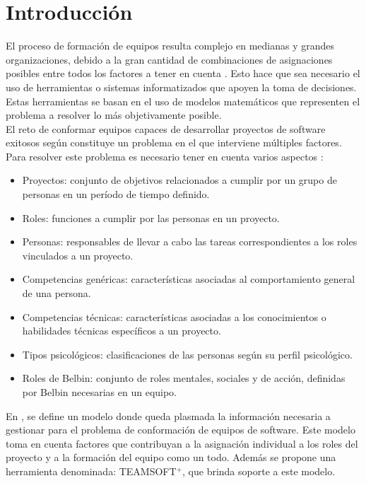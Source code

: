 \chapter*{Introducción}

El proceso de formación de equipos resulta complejo en medianas y grandes organizaciones, debido a la gran cantidad de combinaciones de asignaciones posibles entre todos los factores a tener en cuenta \cite{Mayi09}. Esto hace que sea necesario el uso de herramientas o sistemas informatizados que apoyen la toma de decisiones. Estas herramientas se basan en el uso de modelos matemáticos que representen el problema a resolver lo más objetivamente posible.\\ 

El reto de conformar equipos capaces de desarrollar proyectos de software exitosos según \cite{ana14} constituye un problema en el que interviene múltiples factores. Para resolver este problema es necesario tener en cuenta varios aspectos \cite{ana15}:
\begin{itemize}
	
\item Proyectos: conjunto de objetivos relacionados a cumplir por un grupo de personas en un período de tiempo definido.

\item Roles: funciones a cumplir por las personas en un proyecto.

\item Personas: responsables de llevar a cabo las tareas correspondientes a los roles vinculados a un proyecto.

\item Competencias genéricas: características asociadas al comportamiento general de una persona.

\item Competencias técnicas: características asociadas a los conocimientos o habilidades técnicas específicos a un proyecto. 

\item Tipos psicológicos: clasificaciones de las personas según su perfil psicológico.

\item Roles de Belbin: conjunto de roles mentales, sociales y de acción, definidas por Belbin necesarias en un equipo.

\end{itemize}	

En \cite{Mayi09}, se define un modelo donde queda plasmada la información necesaria a gestionar para el problema de conformación de equipos de software. Este modelo toma en cuenta factores que contribuyan a la asignación individual a los roles del proyecto y a la formación del equipo como un todo. Además se propone una herramienta denominada: TEAMSOFT$^+$, que brinda soporte a este modelo.\\

